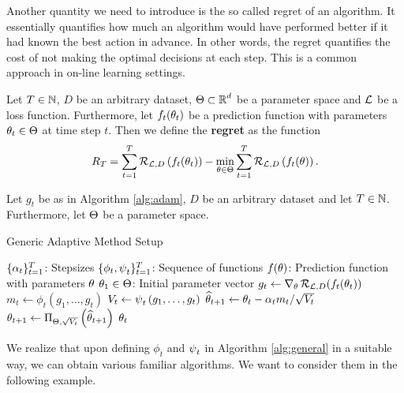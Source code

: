 Another quantity we need to introduce is the so called regret of an algorithm. It essentially quantifies how much an algorithm would have performed better if it had known the best action in advance. In other words, the regret quantifies the cost of not making the optimal decisions at each step. This is a common approach in on-line learning settings.

\begin{definition}\label{def:regret}
Let $T\in \operatorname{\mathbb{N}}$, $D$ be an arbitrary dataset, $\operatorname{\Theta}\subset\operatorname{\mathbb{R}}^d$ be a parameter space and $\operatorname{\mathcal{L}}$ be a loss function. Furthermore, let $f_t(\theta_t)$ be a prediction function with parameters $\theta_t\in\operatorname{\Theta}$ at time step $t$. Then we define the \textbf{regret} as the function
\begin{align*}
R_T = \sum_{t=1}^T\operatorname{\mathcal{R}}_{\operatorname{\mathcal{L}}, D}\left(f_t(\theta_t) \right) - \min_{\theta \in\operatorname{\Theta}} \sum_{t=1}^T\operatorname{\mathcal{R}}_{\operatorname{\mathcal{L}}, D}\left(f_t(\theta)\right).
\end{align*}
\end{definition}

\begin{algorithm}[H]
Let $g_t$ be as in Algorithm \ref{alg:adam}, $D$ be an arbitrary dataset and let $T\in\operatorname{\mathbb{N}}$. Furthermore, let $\operatorname{\Theta}$ be a parameter space.
\caption{Generic Adaptive Method Setup}\label{alg:general}
\begin{algorithmic}[1]
\Require $\{\alpha_t\}_{t=1}^T$: Stepsizes
\Require $\{\phi_t, \operatorname{\psi}_t\}_{t=1}^T$: Sequence of functions
\Require $f(\theta)$: Prediction function with parameters $\theta$
\Require $\theta_1\in\operatorname{\Theta}$: Initial parameter vector
	\State $g_t \gets \nabla_{\theta}\operatorname{\mathcal{R}}_{\operatorname{\mathcal{L}}, D}(f_t(\theta_t))$ 
	\State $m_t \gets \phi_t\left(g_1,\ldots,g_t \right)$ 
	\State $V_t \gets \operatorname{\psi}_t\left(g_1,\ldots,g_t\right)$ 
	\State $\widehat{\theta}_{t+1} \gets \theta_t - \alpha_t m_t/\sqrt{V_t}$ 
	\State $\theta_{t+1} \gets \Pi_{\operatorname{\Theta},\sqrt{V_t}}\left(\widehat{\theta}_{t+1} \right)$ 
\EndFor
\State \Return $\theta_{t}$ 
\end{algorithmic}
\end{algorithm}

We realize that upon defining $\phi_t$ and $\operatorname{\psi}_t$ in Algorithm \ref{alg:general} in a suitable way, we can obtain various familiar algorithms. We want to consider them in the following example.

